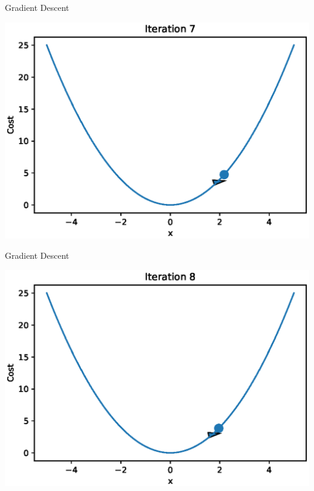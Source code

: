 \documentclass{beamer}
\begin{document}
\begin{frame}{Gradient Descent}
  \begin{center}
       \includegraphics[totalheight=6cm]{gradient-descent/iteration-7.eps}
   \end{center}
\end{frame}

\begin{frame}{Gradient Descent}
  \begin{center}
       \includegraphics[totalheight=6cm]{gradient-descent/iteration-8.eps}
   \end{center}
\end{frame}
\end{document}

